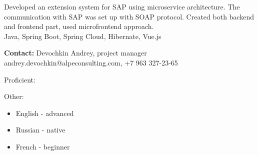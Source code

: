 \documentclass[10pt,a4paper,ragged2e,withhyper]{altacv}
\begin{document}
\begin{paracol}{2}
Developed an extension system for SAP using microservice architecture. The communication with SAP was set up with SOAP protocol. Created both backend and frontend part, used microfrontend approach.\\
Java, Spring Boot, Spring Cloud, Hibernate, Vue.js

\smallskip

\textbf{Contact:} Devochkin Andrey, project manager\\
andrey.devochkin@alpeconsulting.com, +7 963 327-23-65

\switchcolumn





Proficient:

Other:

\divider\smallskip



\divider\smallskip



\divider\smallskip





\begin{itemize}
\item English - advanced
\item Russian - native
\item French - beginner
\end{itemize}



\end{paracol}
\end{document}
